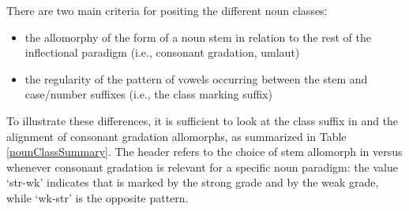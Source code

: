 There are two main criteria for positing the different noun classesː
\begin{itemize}
\item{the allomorphy of the  form of a noun stem in relation to the rest of the inflectional paradigm (i.e., consonant gradation, umlaut)}
\item{the regularity of the pattern of vowels occurring between the stem and case/number suffixes (i.e., the class marking suffix)}
\end{itemize} 
To illustrate these differences, it is sufficient to look at the class suffix in  and the alignment of consonant gradation allomorphs, as summarized in  
Table \vref{nounClassSummary}. %
The header  refers to the choice of stem allomorph in  versus  whenever consonant gradation is relevant for a specific noun paradigm: the value ‘str-wk’ indicates that  is marked by the strong grade and  by the weak grade, while ‘wk-str’ is the opposite pattern. %
